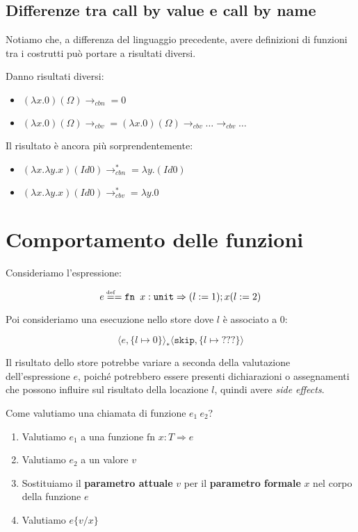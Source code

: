 \subsection{Differenze tra call by value e call by name}
Notiamo che, a differenza del linguaggio precedente, avere definizioni
di funzioni tra i costrutti può portare a risultati diversi. 
\begin{tcolorbox}
    Danno risultati diversi:
    \begin{itemize}
        \item $(\lambda x.0)(\Omega)\rightarrow_{cbn} = 0 $
        \item $(\lambda x.0)(\Omega)\rightarrow_{cbv} = (\lambda x.0)(\Omega)
        \rightarrow_{cbv}\dots \rightarrow_{cbv}\dots$
    \end{itemize}
\end{tcolorbox}
\begin{tcolorbox}
Il risultato è ancora più sorprendentemente:
\begin{itemize}
    \item $(\lambda x.\lambda y.x)(Id 0)\rightarrow^{*}_{ cbn} = \lambda y.(Id 0) $
    \item $(\lambda x.\lambda y.x)(Id 0)\rightarrow^{*}_{ cbv} = \lambda y.0$
\end{itemize}
\end{tcolorbox}
\section{Comportamento delle funzioni}

Consideriamo l'espressione:

\[ e \defeq = \texttt{fn } x : \texttt{unit} \Rightarrow (l := 1);x(l := 2) \]

Poi consideriamo una esecuzione nello store dove $l$ è associato a $0$:

\[ \langle e, \{l \mapsto 0\} \rangle_* \langle \texttt{skip}, \{l \mapsto ???\} \rangle \]

Il risultato dello store potrebbe variare a seconda della valutazione dell'espressione $e$, poiché
potrebbero essere presenti dichiarazioni o assegnamenti che possono influire sul risultato della 
locazione $l$, quindi avere \textit{side effects}.

Come valutiamo una chiamata di funzione $e_1 \ e_2$?

\begin{tcolorbox}
[title = Call-by-value (\textit{detta anche valutazione eager})]
\begin{enumerate}
    \item Valutiamo $e_1$ a una funzione $\text{fn } x:T \Rightarrow e$
    \item Valutiamo $e_2$ a un valore $v$
    \item Sostituiamo il \textbf{parametro attuale} $v$ per il \textbf{parametro
    formale} $x$ nel corpo della funzione $e$
    \item Valutiamo $e\{v/x\}$
\end{enumerate}
\end{tcolorbox}

